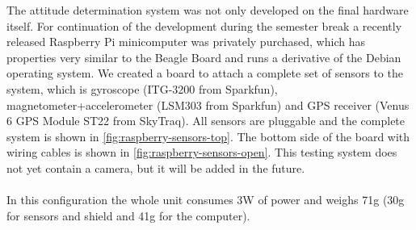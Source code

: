 The attitude determination system was not only developed on the final hardware itself.
For continuation of the development during the semester break a recently released Raspberry Pi minicomputer was privately purchased, which has properties very similar to the Beagle Board and runs a derivative of the Debian operating system. We created a board to attach a complete set of sensors to the system, which is gyroscope (ITG-3200 from Sparkfun), magnetometer+accelerometer (LSM303 from Sparkfun) and GPS receiver (Venus 6 GPS Module
ST22 from SkyTraq). All sensors are pluggable and the complete system is shown in \autoref{fig:raspberry-sensors-top}. The bottom side of the board with wiring cables is shown in \autoref{fig:raspberry-sensors-open}.
This testing system does not yet contain a camera, but it will be added in the future.
\\
\\
In this configuration the whole unit consumes 3W of power and weighs 71g (30g for sensors and shield and 41g for the computer).



